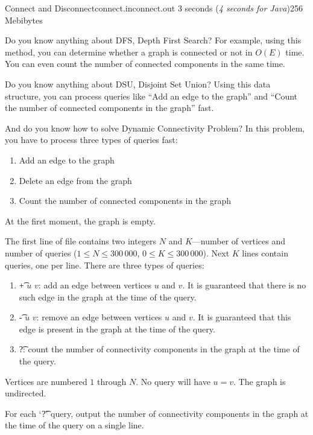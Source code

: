 \begin{problem}{Connect and Disconnect}{connect.in}{connect.out}
{3 seconds (\textit{4 seconds for Java})}{256 Mebibytes}{}


Do you know anything about DFS, Depth First Search? 
For example, using this method, you can determine whether a graph
is connected or not in $O(E)$ time.
You can even count the number of connected components in the same time.

Do you know anything about DSU, Disjoint Set Union?
Using this data structure, you can process queries like
``Add an edge to the graph'' and
``Count the number of connected components in the graph'' fast.

And do you know how to solve Dynamic Connectivity Problem?
In this problem, you have to process three types of queries fast:
\begin{enumerate}
  \setlength{\parskip}{-4pt}
  \setlength{\itemsep}{6pt}
  \item Add an edge to the graph
  \item Delete an edge from the graph
  \item Count the number of connected components in the graph
\end{enumerate}

\InputFile

At the first moment, the graph is empty.

The first line of file contains two integers $N$ and $K$---number of
vertices and number of queries
($1 \le N \le 300\,000$, $0 \le K \le 300\,000$).
Next $K$ lines contain queries, one per line.
There are three types of queries:
\begin{enumerate}
  \setlength{\parskip}{-2pt}
  \setlength{\itemsep}{7pt}
  \item \t{+ $u$ $v$}: add an edge between vertices $u$ and $v$.
  It is guaranteed that there is no such edge in the graph at the time
  of the query.
  \item \t{- $u$ $v$}: remove an edge between vertices $u$ and $v$.
  It is guaranteed that this edge is present in the graph at the time
  of the query.
  \item \t{?}: count the number of connectivity components in the graph
  at the time of the query.
\end{enumerate}
Vertices are numbered $1$ through $N$.
No query will have $u = v$.
The graph is undirected.

\OutputFile

For each `\t{?}' query, output the number of connectivity components
in the graph at the time of the query on a single line.

\Example
\begin{example}
%
\end{example}

\end{problem}

